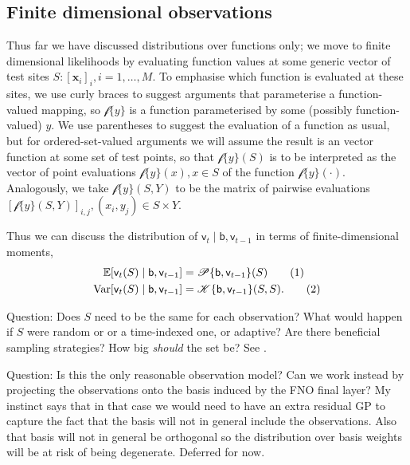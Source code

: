 \documentclass{article}
\newcommand\numberthis{\addtocounter{equation}{1}\tag{\theequation}}
\newcommand{\var}{\operatorname{Var}}
\newcommand{\vv}[1]{\boldsymbol{#1}}
\newcommand{\rv}[1]{\mathsf{#1}}
\newcommand{\set}[1]{#1}
\newcommand{\op}[1]{\mathscr{#1}}
\newcommand{\gvn}{\mid}
\newcommand{\Ex}{\mathbb{E}}
\newcommand{\lat}{\rv{b}}   %
\begin{document}
\subsection{Finite dimensional observations}
Thus far we have discussed distributions over functions only; we move to finite dimensional likelihoods by evaluating function values at some generic vector of test sites \(\set{S}:[\vv{x}_{i}]_{i}, i=1,\dots,M\).
To emphasise which function is evaluated at these sites, we use curly braces to suggest arguments that parameterise a function-valued mapping, so \(\op{f}\{y\}\) is a function parameterised by some (possibly function-valued) \(y\).
We use parentheses to suggest the evaluation of a function as usual, but for ordered-set-valued arguments we will assume the result is an vector function at some set of test points, so that \(\op{f}\{y\}(\set{S})\) is to be interpreted as the vector of point evaluations \(\op{f}\{y\}(x), x\in \set{S}\) of the function \(\op{f}\{y\}(\cdot)\).
Analogously, we take \(\op{f}\{y\}(\set{S},\set{Y})\) to be the matrix of pairwise evaluations \([\op{f}\{y\}(\set{S},\set{Y})]_{i,j}, (x_i,y_j)\in\set{S}\times\set{Y}\).

Thus we can discuss the distribution of \(\rv{v}_{t}\gvn \lat,\rv{v}_{t-1}\) in terms of finite-dimensional moments,
\begin{align*}
\Ex[\rv{v}_{t}(\set{S})\gvn \lat,\rv{v}_{t-1}]
&= \op{P}\{\lat,\rv{v}_{t-1}\}(\set{S})\label{eq:fidi_proc_ex}\numberthis\\
\var[\rv{v}_{t}(\set{S})\gvn \lat,\rv{v}_{t-1}]
&= \op{K}\{\lat,\rv{v}_{t-1}\}(\set{S},\set{S}).\label{eq:fidi_proc_var} \numberthis
\end{align*}

Question: Does \(\set{S}\) need to be the same for each observation?
What would happen if \(\set{S}\) were random or or a time-indexed one, or adaptive?
Are there beneficial sampling strategies?
How big \emph{should} the set be? See \cite{LassasDiscretizationinvariant2009}.

Question: Is this the only reasonable observation model? 
Can we work instead by projecting the observations onto the basis induced by the FNO final layer?
My instinct says that in that case we would need to have an extra residual GP to capture the fact that the basis will not in general include the observations.
Also that basis will not in general be orthogonal so the distribution over basis weights will be at risk of being degenerate.
Deferred for now.
\end{document}
